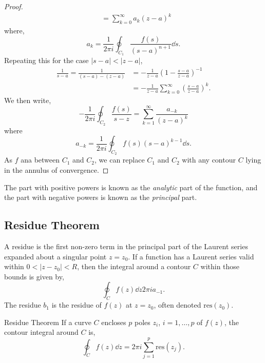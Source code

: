 \documentclass{book}
\begin{document}
\begin{proof}
\begin{equation}
\begin{split}
		& = \sum_{k=0}^{\infty} a_k(z -a)^k
		\end{split}
	\end{equation}
	where,
	\begin{equation}
		a_k = \frac{1}{2\pi i }\oint_{C_1} \frac{f(s)}{(s-a)^{n+1}}\dd{s}.
	\end{equation}
	Repeating this for the case $|s - a| < |z - a|$,
	\begin{equation}
		\begin{split}
			\frac{1}{s-a} = \frac{1}{(s-a)-(z-a)} & = -\frac{1}{z-a}\left(1-\frac{s-a}{z-a}\right)^{-1} \\
			& = -\frac{1}{z-a}\sum_{k=0}^{\infty}\left(\frac{s-a}{z-a}\right)^{k}.
		\end{split}
	\end{equation}
	We then write,
	\begin{equation}
		-\frac{1}{2\pi i }\oint_{C_2} \frac{f(s)}{s-z} = \sum_{k=1}^{\infty}\frac{a_{-k}}{(z-a)^k}
	\end{equation}
	where
	\begin{equation}
		a_{-k} = \frac{1}{2\pi i }\oint_{C_2}f(s) (s-a)^{k-1}\dd{s}.
	\end{equation}
	As $f$ ana between $C_1$ and $C_2$, we can replace $C_1$ and $C_2$ with any contour $C$ lying in the annulus of convergence.
\end{proof}
The part with positive powers is known as the \textit{analytic} part of the function, and the part with negative powers is known as the \textit{principal} part.
\subsection{Residue Theorem}
A residue is the first non-zero term in the principal part of the Laurent series expanded about a singular point $z = z_0$. If a function has a Laurent series valid within $0 < |z - z_0| < R$, then the integral around a contour $C$ within those bounds is given by,
\begin{equation}
	\oint_C f(z) \dd{z} 2\pi i a_{-1}.
\end{equation}
The residue $b_1$ is the residue of $f(z)$ at $z = z_0$, often denoted $\text{res}(z_0)$. 
\begin{Theorems}{Residue Theorem}{}
	If a curve $C$ encloses $p$ poles $z_i$, $i=1,\ldots, p$ of $f(z)$, the contour integral around $C$ is,
	\begin{equation}
		\oint_C f(z) \dd{z} =2\pi i\sum_{j=1}^p\text{res}(z_j).
	\end{equation}
\end{Theorems}
\end{document}

